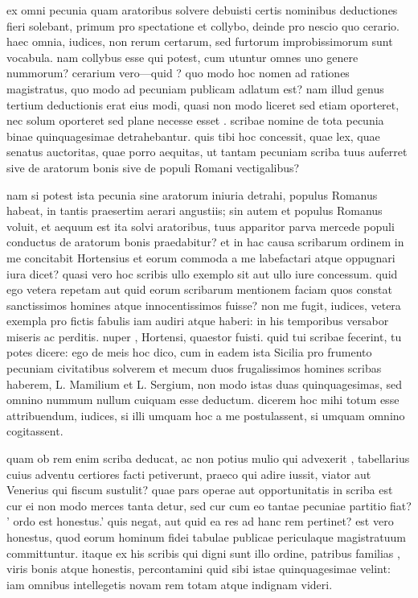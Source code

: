  ex omni pecunia quam aratoribus solvere debuisti certis nominibus deductiones fieri solebant, primum pro spectatione et collybo, deinde pro nescio quo cerario. haec omnia, iudices, non rerum certarum, sed furtorum improbissimorum sunt vocabula. nam collybus esse qui potest, cum utuntur omnes uno genere nummorum? cerarium vero—quid ? quo modo hoc nomen ad rationes magistratus, quo modo ad pecuniam publicam adlatum est? nam illud genus tertium deductionis erat eius modi, quasi non modo liceret sed etiam oporteret, nec solum oporteret sed plane necesse esset . scribae nomine de tota pecunia binae quinquagesimae detrahebantur. quis tibi hoc concessit, quae lex, quae senatus auctoritas, quae porro aequitas, ut tantam pecuniam scriba tuus auferret sive de aratorum bonis sive de populi Romani vectigalibus?

 nam si potest ista pecunia sine aratorum iniuria detrahi, populus Romanus habeat, in tantis praesertim aerari angustiis; sin autem et populus Romanus voluit, et aequum est ita solvi aratoribus, tuus apparitor parva mercede populi conductus de aratorum bonis praedabitur? et in hac causa scribarum ordinem in me concitabit Hortensius et eorum commoda a me labefactari atque oppugnari iura dicet? quasi vero hoc scribis ullo exemplo sit aut ullo iure concessum. quid ego vetera repetam aut quid eorum scribarum mentionem faciam quos constat sanctissimos homines atque innocentissimos fuisse? non me fugit, iudices, vetera exempla pro fictis fabulis iam audiri atque haberi: in his temporibus versabor miseris ac perditis. nuper , Hortensi, quaestor fuisti. quid tui scribae fecerint, tu potes dicere: ego de meis hoc dico, cum in eadem ista Sicilia pro frumento pecuniam civitatibus solverem et mecum duos frugalissimos homines scribas haberem, L. Mamilium et L. Sergium, non modo istas duas quinquagesimas, sed omnino nummum nullum cuiquam esse deductum. dicerem hoc mihi totum esse attribuendum, iudices, si illi umquam hoc a me postulassent, si umquam omnino cogitassent.

 quam ob rem enim scriba deducat, ac non potius mulio qui advexerit , tabellarius cuius adventu certiores facti petiverunt, praeco qui adire iussit, viator aut Venerius qui fiscum sustulit? quae pars operae aut opportunitatis in scriba est cur ei non modo merces tanta detur, sed cur cum eo tantae pecuniae partitio fiat? ' ordo est honestus.' quis negat, aut quid ea res ad hanc rem pertinet? est vero honestus, quod eorum hominum fidei tabulae publicae periculaque magistratuum committuntur. itaque ex his scribis qui digni sunt illo ordine, patribus familias , viris bonis atque honestis, percontamini quid sibi istae quinquagesimae velint: iam omnibus intellegetis novam rem totam atque indignam videri.

